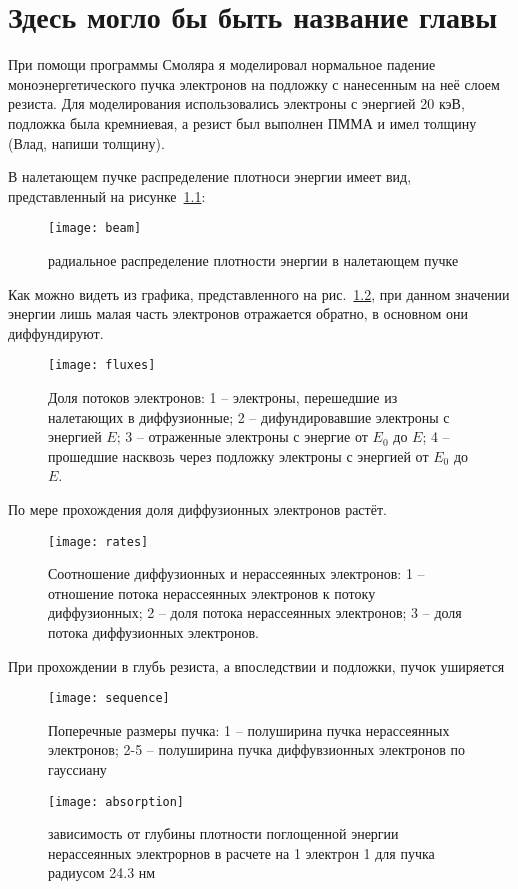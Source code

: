 \chapter{Здесь могло бы быть название главы}
При помощи программы Смоляра я моделировал нормальное падение моноэнергетического пучка электронов на подложку с нанесенным на неё слоем резиста. Для моделирования использовались электроны с энергией 20 кэВ, подложка была кремниевая, а резист был выполнен ПММА и имел толщину (Влад, напиши толщину).

В налетающем пучке распределение плотноси энергии имеет вид, представленный на рисунке~\ref{fig:beam}:
\begin{figure}[h]
    \center
    \texttt{[image: beam]}
    \caption{радиальное распределение плотности энергии в налетающем пучке}
    \label{fig:beam}
\end{figure}

Как можно видеть из графика, представленного на рис.~\ref{fig:fluxes}, при данном значении энергии лишь малая часть электронов отражается обратно, в основном они диффундируют.
\begin{figure}[h]
    \center
    \texttt{[image: fluxes]}
    \caption{Доля потоков электронов:
    1 -- электроны, перешедшие из налетающих в диффузионные;
2 -- дифундировавшие электроны с энергией $E$;
3 -- отраженные электроны с энергие от $E_0$ до $E$;
4 -- прошедшие насквозь через подложку электроны с энергией от $E_0$ до $E$.
}
    \label{fig:fluxes}
\end{figure}


По мере прохождения доля диффузионных электронов растёт.

\begin{figure}[h]
    \center
    \texttt{[image: rates]}
    \caption{Соотношение диффузионных и нерассеянных электронов: 1 -- отношение потока нерассеянных электронов к потоку диффузионных;
2 -- доля потока нерассеянных электронов;
3 -- доля потока диффузионных электронов.
}
    \label{fig:rates}
\end{figure}

При прохождении в глубь резиста, а впоследствии и подложки, пучок уширяется
\begin{figure}[h]
    \center
    \texttt{[image: sequence]}
    \caption{Поперечные размеры пучка:
1 -- полуширина пучка нерассеянных электронов;
2-5 -- полуширина пучка диффувзионных электронов по гауссиану}
    \label{fig:sequence}
\end{figure}


\begin{figure}[h]
    \center
    \texttt{[image: absorption]}
    \caption{зависимость от глубины плотности поглощенной энергии нерассеянных электрорнов в расчете на 1 электрон 1 для пучка радиусом 24.3 нм}
    \label{fig:absorption}
\end{figure}
